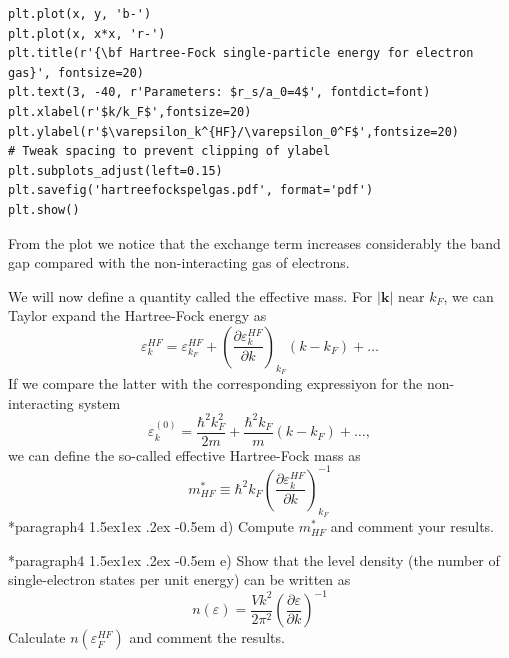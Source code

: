 \documentclass[%
oneside,                 %
final,                   %
10pt]{article}
\makeatletter
\newenvironment{doconceexercise}{}{}
\newcommand\subex{\@startsection*{paragraph}{4}{\z@}%
                  {1.5ex\@plus1ex \@minus.2ex}%
                  {-0.5em}%
                  {\normalfont\normalsize\bfseries}}
\makeatother
\begin{document}
\begin{doconceexercise}
\begin{verbatim}
plt.plot(x, y, 'b-')
plt.plot(x, x*x, 'r-')
plt.title(r'{\bf Hartree-Fock single-particle energy for electron gas}', fontsize=20)     
plt.text(3, -40, r'Parameters: $r_s/a_0=4$', fontdict=font)
plt.xlabel(r'$k/k_F$',fontsize=20)
plt.ylabel(r'$\varepsilon_k^{HF}/\varepsilon_0^F$',fontsize=20)
# Tweak spacing to prevent clipping of ylabel
plt.subplots_adjust(left=0.15)
plt.savefig('hartreefockspelgas.pdf', format='pdf')
plt.show()
\end{verbatim}
From the plot we notice that the exchange term increases considerably the band gap
compared with the non-interacting gas of electrons.

We will now define a quantity called the effective mass.
For $\vert\mathbf{k}\vert$ near $k_{F}$, we can Taylor expand the Hartree-Fock energy as  
\[
\varepsilon_{k}^{HF}=\varepsilon_{k_{F}}^{HF}+
\left(\frac{\partial\varepsilon_{k}^{HF}}{\partial k}\right)_{k_{F}}(k-k_{F})+\dots
\]
If we compare the latter with the corresponding expressiyon for the non-interacting system
\[
\varepsilon_{k}^{(0)}=\frac{\hbar^{2}k^{2}_{F}}{2m}+
\frac{\hbar^{2}k_{F}}{m}\left(k-k_{F}\right)+\dots ,
\]
we can define the so-called effective Hartree-Fock mass as
\[
m_{HF}^{*}\equiv\hbar^{2}k_{F}\left(
\frac{\partial\varepsilon_{k}^{HF}}
{\partial k}\right)_{k_{F}}^{-1}
\]
\subex{d)}
Compute $m_{HF}^{*}$ and comment your results.

\subex{e)}
Show that the level density (the number of single-electron states per unit energy) can be written as
\[
n(\varepsilon)=\frac{Vk^{2}}{2\pi^{2}}\left(
\frac{\partial\varepsilon}{\partial k}\right)^{-1}
\]
Calculate $n(\varepsilon_{F}^{HF})$ and comment the results.




\end{doconceexercise}
\end{document}
